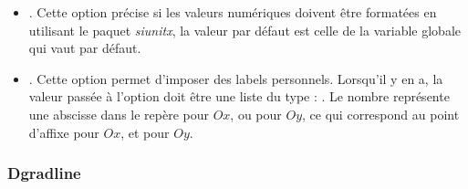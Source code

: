 \begin{itemize}
\begin{itemize}
            \item {}. Cette option précise si les valeurs numériques doivent être formatées en utilisant le paquet \emph{siunitx}, la valeur par défaut est celle de la variable globale  qui vaut \false par défaut.
            
            \item {}. Cette option permet d'imposer des labels personnels. Lorsqu'il y en a, la valeur passée à l'option doit être une liste du type : . Le nombre  représente une abscisse dans le repère  pour $Ox$, ou  pour $Oy$, ce qui correspond au point d'affixe  pour $Ox$, et  pour $Oy$.
        \end{itemize}
\end{itemize}

\subsubsection{Dgradline}

